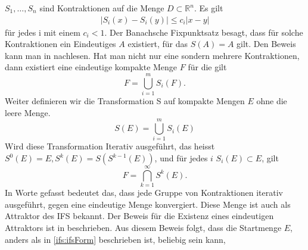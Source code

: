 $S_1,\dots,S_n$ sind Kontraktionen auf die Menge $D \subset \mathbb{R}^n$. Es gilt
\begin{align}
	|S_i(x) - S_i(y)| \leq c_i|x - y|
\end{align}
für jedes i mit einem $c_i < 1$.
Der Banachsche Fixpunktsatz besagt, dass für solche Kontraktionen ein Eindeutiges $A$ existiert, für das $S(A) = A$ gilt.
Den Beweis kann man in \cite{ifs:Rousseau2012} nachlesen.
Hat man nicht nur eine sondern mehrere Kontraktionen, dann existiert eine eindeutige kompakte Menge $F$ für die gilt
\begin{equation}
	F = \bigcup\limits_{i = 1}^{m} S_i(F).
\end{equation}
Weiter definieren wir die Transformation S auf kompakte Mengen $E$ ohne die leere Menge.
\begin{equation}
	S(E) = \bigcup\limits_{i = 1}^m S_i(E)
\end{equation}
Wird diese Transformation Iterativ ausgeführt, das heisst $S^0(E) = E, S^k(E) = S(S^{k-1}(E))$, und für jedes $i$ $S_i(E) \subset E$, gilt
\begin{equation}
	F = \bigcap\limits_{k = 1}^{\infty} S^k(E).
	\label{ifs:ifsForm}
\end{equation}
In Worte gefasst bedeutet das, dass jede Gruppe von Kontraktionen iterativ ausgeführt, gegen eine eindeutige Menge konvergiert.
Diese Menge ist auch als Attraktor des IFS bekannt.
Der Beweis für die Existenz eines eindeutigen Attraktors ist in \cite{ifs:fractal-geometry} beschrieben. 
Aus diesem Beweis folgt, dass die Startmenge $E$, anders als in \ref{ifs:ifsForm} beschrieben ist, beliebig sein kann, 
